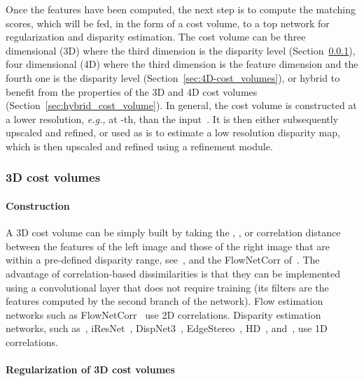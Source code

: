 \documentclass[10pt,journal,compsoc]{IEEEtran}
\newcommand{\eg}{\emph{e.g., }}
\begin{document}
Once the features have been computed, the next step is to compute the matching scores, which will be fed, in the form of a  cost volume,  to a top network for regularization and disparity estimation. The cost volume can be  three dimensional (3D) where the third dimension is  the disparity level (Section~\ref{sec:3D_cost_volumes}), four dimensional (4D) where the third dimension is  the feature dimension and the fourth one is the  disparity level (Section~\ref{sec:4D-cost_volumes}),  or hybrid to benefit from the properties of the 3D and 4D cost volumes (Section~\ref{sec:hybrid_cost_volume}). In general, the cost volume is constructed at a lower resolution,  \eg at -th, than the input~\cite{khamis2018stereonet,zhang2018activestereonet}. It is then either subsequently upscaled and refined, or used as is to estimate a low resolution disparity map, which is then upscaled and refined using a refinement module. 

\subsubsection{3D cost volumes}
\label{sec:3D_cost_volumes}


\paragraph{Construction}

A 3D cost volume can be simply built by taking the , , or  correlation distance between the features of the left image and those of the right image that are within a pre-defined disparity range, see~\cite{mayer2016large,zhang2018activestereonet,jie2018left,khamis2018stereonet,yin2019hierarchical,chabra2019stereodrnet,Duggal_2019_ICCV},  and the FlowNetCorr of~\cite{dosovitskiy2015flownet}.  The advantage of correlation-based dissimilarities is that they can be implemented using a convolutional layer that does not require training (its filters are the features computed by the second branch of the network). Flow estimation networks such as FlowNetCorr~\cite{dosovitskiy2015flownet} use 2D correlations. Disparity estimation networks,  such as~\cite{mayer2016large,yang2018segstereo}, iResNet~\cite{liang2018learning},  DispNet3~\cite{Ilg_2018_ECCV}, EdgeStereo~\cite{song2018stereo}, HD~\cite{yin2019hierarchical}, and~\cite{tonioni2019real,Duggal_2019_ICCV}, use 1D correlations. 	

\paragraph{Regularization of 3D cost volumes}
\end{document}
